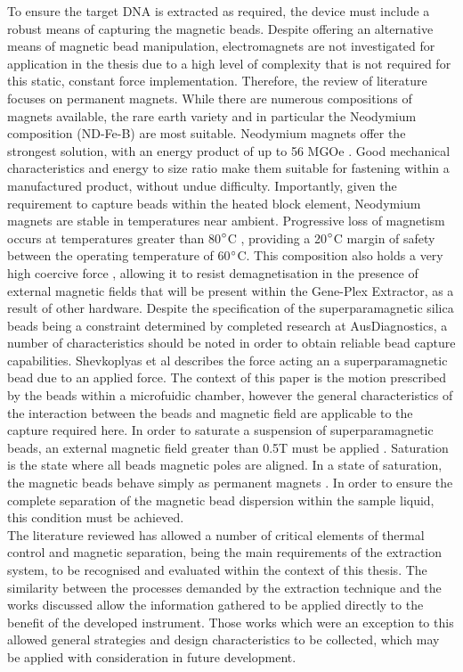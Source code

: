 To ensure the target DNA is extracted as required, the device must include a robust means of capturing the magnetic beads. Despite offering an alternative means of magnetic bead manipulation, electromagnets are not investigated for application in the thesis due to a high level of complexity that is not required for this static, constant force implementation. Therefore, the review of literature focuses on permanent magnets. While there are numerous compositions of magnets available, the rare earth variety and in particular the Neodymium composition (ND-Fe-B) are most suitable. Neodymium magnets offer the strongest solution, with an energy product of up to 56 MGOe \cite{2006189852255}. Good mechanical characteristics and energy to size ratio make them suitable for fastening within a manufactured product, without undue difficulty. Importantly, given the requirement to capture beads within the heated block element, Neodymium magnets are stable in temperatures near ambient. Progressive loss of magnetism occurs at temperatures greater than 80$\degree$C \cite{2006189852255}, providing a 20$\degree$C margin of safety between the operating temperature of 60$\degree$C. This composition also holds a very high coercive force \cite{2006189852255}, allowing it to resist demagnetisation in the presence of external magnetic fields that will be present within the Gene-Plex Extractor, as a result of other hardware. Despite the specification of the superparamagnetic silica beads being a constraint determined by completed research at AusDiagnostics, a number of characteristics should be noted in order to obtain reliable bead capture capabilities. Shevkoplyas et al describes the force acting an a superparamagnetic bead due to an applied force. The context of this paper is the motion prescribed by the beads within a microfuidic chamber, however the general characteristics of the interaction between the beads and magnetic field are applicable to the capture required here. In order to saturate a suspension of superparamagnetic beads, an external magnetic field greater than 0.5T must be applied \cite{9774403}. Saturation is the state where all beads magnetic poles are aligned. In a state of saturation, the magnetic beads behave simply as permanent magnets \cite{9774403}\cite{8667402}. In order to ensure the complete separation of the magnetic bead dispersion within the sample liquid, this condition must be achieved.\\

The literature reviewed has allowed a number of critical elements of thermal control and magnetic separation, being the main requirements of the extraction system, to be recognised and evaluated within the context of this thesis. The similarity between the processes demanded by the extraction technique and the works discussed allow the information gathered to be applied directly to the benefit of the developed instrument. Those works which were an exception to this allowed general strategies and design characteristics to be collected, which may be applied with consideration in future development.


